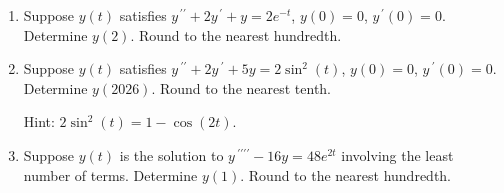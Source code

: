 \documentclass{ximera}
\begin{document}
\begin{enumerate}[label=(\arabic*)]
\item Suppose $y(t)$ satisfies $y^{\,\prime\prime}+2y^{\,\prime}+y=2e^{-t}$, $y(0)=0$, $y^{\,\prime}(0)=0$.  Determine $y(2)$.  Round to the nearest hundredth.







\item Suppose $y(t)$ satisfies $y\,^{\prime\prime}+2y\,^{\prime}+5y=2\sin^{2}(t)$, $y(0)=0$, $y\,^{\prime}(0)=0$.  Determine $y(2026)$.  Round to the nearest tenth.    

Hint: $2\sin^2 (t) = 1-\cos (2t)$.









\item  Suppose $y(t)$ is the solution to $y\,^{\prime\prime\prime\prime}-16y=48e^{2t}$ involving the least number of terms.  Determine $y(1)$.  Round to the nearest hundredth.





\end{enumerate}
\end{document}
